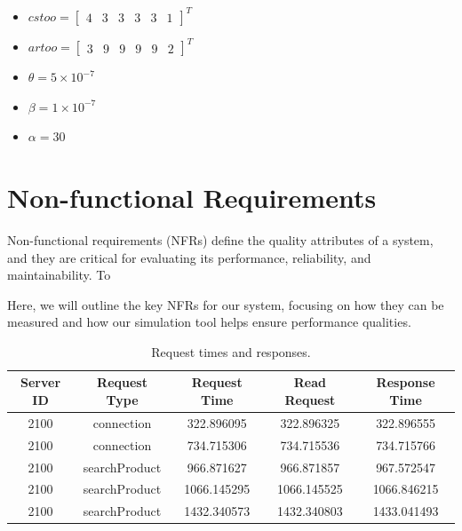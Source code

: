 \begin{itemize}
    \item \( cstoo = \begin{bmatrix} 4 & 3 & 3 & 3 & 3 & 1 \end{bmatrix}^{T} \)
    
    \item \( artoo = \begin{bmatrix} 3 & 9 & 9 & 9 & 9 & 2 \end{bmatrix}^{T} \)
    
    \item \( \theta = 5 \times 10^{-7} \)
    
    \item \( \beta = 1 \times 10^{-7} \)
    
    \item \( \alpha = 30 \)
\end{itemize}



\section{Non-functional Requirements}

Non-functional requirements (NFRs) define the quality attributes of a system, and they are critical for evaluating its performance, reliability, and maintainability. 
To 

Here, we will outline the key NFRs for our system, focusing on how they can be measured and how our simulation tool helps ensure performance qualities.

\begin{table}[H]
    \centering
    \small
    \renewcommand{\arraystretch}{1.5}
    \begin{tabular}{|c|c|c|c|c|}
        \hline
        \textbf{Server ID} & \textbf{Request Type} & \textbf{Request Time} & \textbf{Read Request} & \textbf{Response Time} \\
        \hline
        2100 & connection & 322.896095 & 322.896325 & 322.896555 \\
        \hline
        2100 & connection & 734.715306 & 734.715536 & 734.715766 \\
        \hline
        2100 & searchProduct & 966.871627 & 966.871857 & 967.572547 \\
        \hline
        2100 & searchProduct & 1066.145295 & 1066.145525 & 1066.846215 \\
        \hline
        2100 & searchProduct & 1432.340573 & 1432.340803 & 1433.041493 \\
        \hline
    \end{tabular}
    \caption{Request times and responses.}
    \label{tab:request_times}
\end{table}


